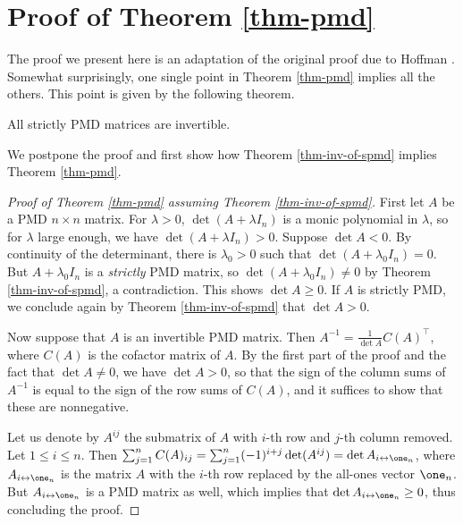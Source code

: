 \documentclass[11pt]{article}
\begin{document}
\nocite{carnicer1999linear}


\appendix
\pagebreak
\section{Proof of Theorem \ref{thm-pmd}}\label{sec-append}

The proof we present here is an adaptation of the original proof due to Hoffman \cite{hoffman1965nonsingularity}. Somewhat surprisingly, one single point in Theorem \ref{thm-pmd} implies all the others. This point is given by the following theorem.

\begin{theorem}\label{thm-inv-of-spmd}
    All strictly PMD matrices are invertible.
\end{theorem}

We postpone the proof and first show how Theorem \ref{thm-inv-of-spmd} implies Theorem \ref{thm-pmd}.

\begin{proof}[Proof of Theorem \ref{thm-pmd} assuming Theorem \ref{thm-inv-of-spmd}]
    First let $A$ be a PMD $n\times n$ matrix. For $\lambda>0$, $\det(A+\lambda I_n)$ is a monic polynomial in $\lambda$, so for $\lambda$ large enough, we have $\det(A+\lambda I_n)>0$. Suppose $\det A<0$. By continuity of the determinant, there is $\lambda_0>0$ such that $\det(A+\lambda_0I_n)=0$. But $A+\lambda_0I_n$ is a \emph{strictly} PMD matrix, so $\det(A+\lambda_0I_n)\neq 0$ by Theorem \ref{thm-inv-of-spmd}, a contradiction. This shows $\det A\ge0$. If $A$ is strictly PMD, we conclude again by Theorem \ref{thm-inv-of-spmd} that $\det A>0$.

    Now suppose that $A$ is an invertible PMD matrix. Then $A^{-1}=\frac{1}{\det A}C(A)^{\top}$, where $C(A)$ is the cofactor matrix of $A$. By the first part of the proof and the fact that $\det A\neq 0$, we have $\det A>0$, so that the sign of the column sums of $A^{-1}$ is equal to the sign of the row sums of $C(A)$, and it suffices to show that these are nonnegative.

    Let us denote by $A^{ij}$ the submatrix of $A$ with $i$-th row and $j$-th column removed. Let $1\le i\le n$. Then $\sum_{j=1}^n C(A)_{ij}=\sum_{j=1}^n(-1)^{i+j}\det(A^{ij})=\det A_{i\leftrightarrow\one_n}$, where $A_{i\leftrightarrow\one_n}$ is the matrix $A$ with the $i$-th row replaced by the all-ones vector $\one_n$. But $A_{i\leftrightarrow \one_n}$ is a PMD matrix as well, which implies that $\det A_{i\leftrightarrow \one_n}\ge 0$, thus concluding the proof.
\end{proof}
\end{document}
